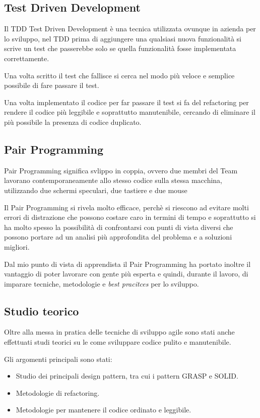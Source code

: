 \subsection{Test Driven Development}
Il TDD Test Driven Development è una tecnica utilizzata ovunque in azienda per lo sviluppo, nel TDD
prima di aggiungere una qualsiasi nuova funzionalità si scrive un test che passerebbe solo se 
quella funzionalità fosse implementata correttamente. 

Una volta scritto il test che fallisce si cerca nel modo più veloce e semplice possibile di fare passare il test.

Una volta implementato il codice per far passare il test si fa del refactoring per rendere il codice più leggibile
e soprattutto manutenibile, cercando di eliminare il più possibile la presenza di codice duplicato.

\subsection{Pair Programming}
Pair Programming significa svlippo in coppia, ovvero due membri del Team lavorano contemporaneamente
allo stesso codice sulla stessa macchina, utilizzando due schermi speculari, due tastiere e due mouse

Il Pair Programming si rivela molto efficace, perchè si riescono ad evitare molti
errori di distrazione che possono costare caro in termini di tempo e soprattutto
si ha molto spesso la possibilità di confrontarsi con punti di vista diversi che possono
portare ad un analisi più approfondita del problema e a soluzioni migliori. 

Dal mio punto di vista di apprendista il Pair Programming ha portato inoltre il vantaggio
di poter lavorare con gente più esperta e quindi, durante il lavoro, di imparare tecniche,
metodologie e \emph{best pracitces} per lo sviluppo.

\subsection{Studio teorico}
Oltre alla messa in pratica delle tecniche di sviluppo agile sono stati anche effettuati studi teorici
su le come sviluppare codice pulito e manutenibile.

Gli argomenti principali sono stati:
\begin{itemize}
\item Studio dei principali design pattern, tra cui i pattern GRASP e SOLID.
\item Metodologie di refactoring.
\item Metodologie per mantenere il codice ordinato e leggibile.
\end{itemize}
